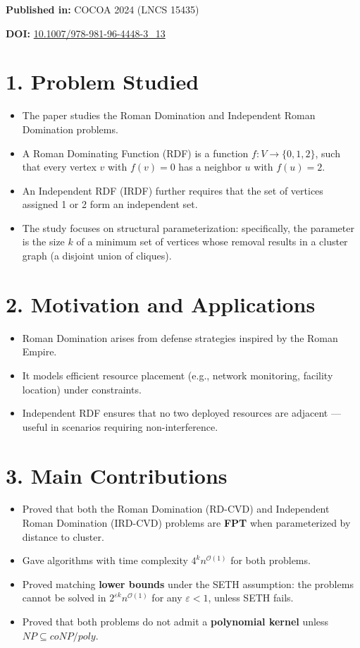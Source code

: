 \documentclass{article}
\begin{document}
\textbf{Published in:} COCOA 2024 (LNCS 15435)

\textbf{DOI:} \href{https://doi.org/10.1007/978-981-96-4448-3_13}{10.1007/978-981-96-4448-3\_13}

\vspace{1em}

\section*{1. Problem Studied}
\begin{itemize}[leftmargin=1.5em]
    \item The paper studies the Roman Domination and Independent Roman Domination problems.
    \item A Roman Dominating Function (RDF) is a function \( f : V \rightarrow \{0,1,2\} \), such that every vertex \( v \) with \( f(v) = 0 \) has a neighbor \( u \) with \( f(u) = 2 \).
    \item An Independent RDF (IRDF) further requires that the set of vertices assigned 1 or 2 form an independent set.
    \item The study focuses on structural parameterization: specifically, the parameter is the size \( k \) of a minimum set of vertices whose removal results in a cluster graph (a disjoint union of cliques).
\end{itemize}

\section*{2. Motivation and Applications}
\begin{itemize}[leftmargin=1.5em]
    \item Roman Domination arises from defense strategies inspired by the Roman Empire.
    \item It models efficient resource placement (e.g., network monitoring, facility location) under constraints.
    \item Independent RDF ensures that no two deployed resources are adjacent — useful in scenarios requiring non-interference.
\end{itemize}

\section*{3. Main Contributions}
\begin{itemize}[leftmargin=1.5em]
    \item Proved that both the Roman Domination (RD-CVD) and Independent Roman Domination (IRD-CVD) problems are \textbf{FPT} when parameterized by distance to cluster.
    \item Gave algorithms with time complexity \( 4^k n^{\mathcal{O}(1)} \) for both problems.
    \item Proved matching \textbf{lower bounds} under the SETH assumption: the problems cannot be solved in \( 2^{\varepsilon k} n^{\mathcal{O}(1)} \) for any \( \varepsilon < 1 \), unless SETH fails.
    \item Proved that both problems do not admit a \textbf{polynomial kernel} unless $NP \subseteq coNP/poly$.
\end{itemize}
\end{document}
